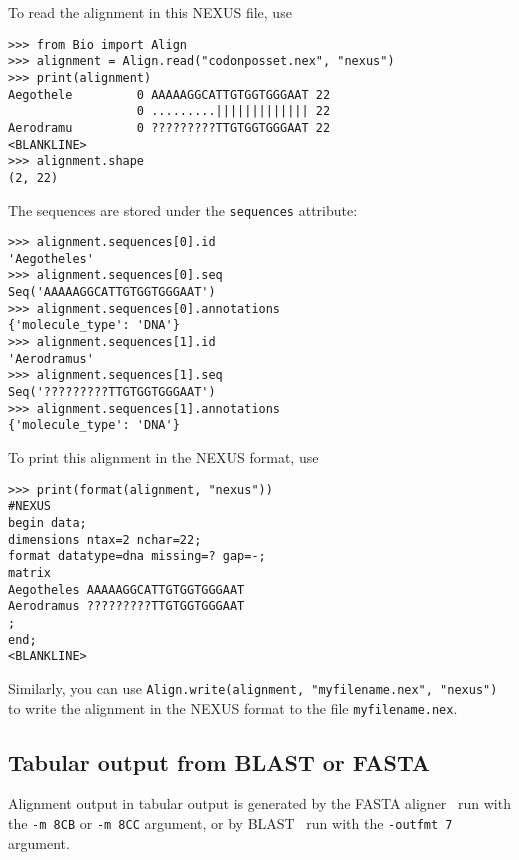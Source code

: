 To read the alignment in this NEXUS file, use
\begin{verbatim}
>>> from Bio import Align
>>> alignment = Align.read("codonposset.nex", "nexus")
>>> print(alignment)
Aegothele         0 AAAAAGGCATTGTGGTGGGAAT 22
                  0 .........||||||||||||| 22
Aerodramu         0 ?????????TTGTGGTGGGAAT 22
<BLANKLINE>
>>> alignment.shape
(2, 22)
\end{verbatim}
The sequences are stored under the \verb|sequences| attribute:
\begin{verbatim}
>>> alignment.sequences[0].id
'Aegotheles'
>>> alignment.sequences[0].seq
Seq('AAAAAGGCATTGTGGTGGGAAT')
>>> alignment.sequences[0].annotations
{'molecule_type': 'DNA'}
>>> alignment.sequences[1].id
'Aerodramus'
>>> alignment.sequences[1].seq
Seq('?????????TTGTGGTGGGAAT')
>>> alignment.sequences[1].annotations
{'molecule_type': 'DNA'}
\end{verbatim}
To print this alignment in the NEXUS format, use
\begin{verbatim}
>>> print(format(alignment, "nexus"))
#NEXUS
begin data;
dimensions ntax=2 nchar=22;
format datatype=dna missing=? gap=-;
matrix
Aegotheles AAAAAGGCATTGTGGTGGGAAT
Aerodramus ?????????TTGTGGTGGGAAT
;
end;
<BLANKLINE>
\end{verbatim}
Similarly, you can use \verb|Align.write(alignment, "myfilename.nex", "nexus")| to write the alignment in the NEXUS format to the file \verb|myfilename.nex|.

\subsection{Tabular output from BLAST or FASTA}
\label{subsec:align_tabular}

Alignment output in tabular output is generated by the FASTA aligner~\cite{pearson1988} run with the \verb|-m 8CB| or  \verb|-m 8CC| argument, or by BLAST~\cite{altschul1990} run with the \verb|-outfmt 7| argument.

